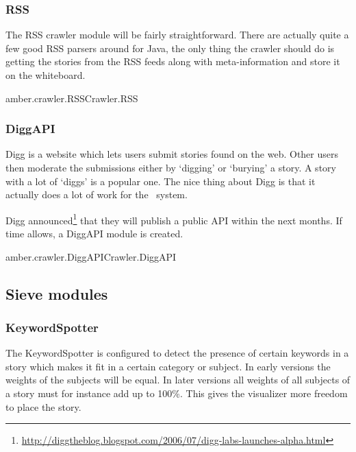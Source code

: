 \subsubsection{RSS}

The RSS crawler module will be fairly straightforward. There are actually quite
a few good RSS parsers around for Java, the only thing the crawler should do is
getting the stories from the RSS feeds along with meta-information and store it
on the whiteboard.

\begin{module}{amber.crawler.RSS}{Crawler.RSS}
\end{module}

\subsubsection{DiggAPI}

Digg is a website which lets users submit stories found on the web. Other users
then moderate the submissions either by `digging' or `burying' a story. A story
with a lot of `diggs' is a popular one. The nice thing about Digg is that it
actually does a lot of work for the \Amber\ system.

Digg
announced\footnote{\url{http://diggtheblog.blogspot.com/2006/07/digg-labs-launches-alpha.html}}
that they will publish a public API within the next months. If time allows, a
DiggAPI module is created.

\begin{module}{amber.crawler.DiggAPI}{Crawler.DiggAPI}
\end{module}

\subsection{Sieve modules}

\subsubsection{KeywordSpotter}

The KeywordSpotter is configured to detect the presence of certain keywords in
a story which makes it fit in a certain category or subject. In early versions
the weights of the subjects will be equal. In later versions all weights of all
subjects of a story must for instance add up to 100\%. This gives the
visualizer more freedom to place the story.


